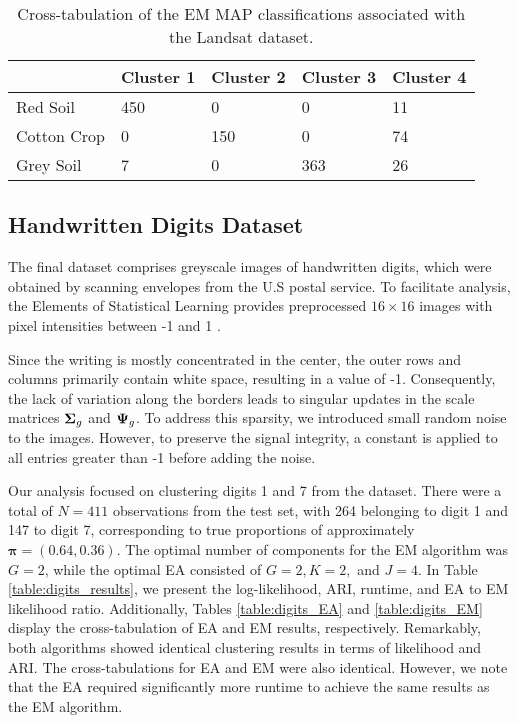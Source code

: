 \documentclass[12pt, centerh1]{article}
\begin{document}
\begin{table}[!htbp]
  \caption{Cross-tabulation of the EM MAP classifications associated with the Landsat dataset.}
      \label{table:landsat_EM}
  \begin{tabularx}{\textwidth}{l *{4}{X}}
  \toprule
   &\textbf{Cluster 1}  & \textbf{Cluster 2}  & \textbf{Cluster 3}  & \textbf{Cluster 4}   \\
  \midrule
  Red Soil & 	450 & 0 & 0 & 11\\
  Cotton Crop &0 & 150 &  0 & 74 \\
   Grey Soil &   7 & 0 &  363  & 26\\
  \bottomrule
  \end{tabularx}
\end{table}


\subsection{Handwritten Digits Dataset}
The final dataset comprises greyscale images of handwritten digits, which were obtained by scanning envelopes from the U.S postal service. To facilitate analysis, the Elements of Statistical Learning provides preprocessed $16 \times 16$ images with pixel intensities between -1 and 1 \citep{hastie2009}. 

Since the writing is mostly concentrated in the center, the outer rows and columns primarily contain white space, resulting in a value of -1. Consequently, the lack of variation along the borders leads to singular updates in the scale matrices ${\bf \Sigma}_g$ and ${\bf \Psi}_g$. To address this sparsity, we introduced small random noise to the images. However, to preserve the signal integrity, a constant is applied to all entries greater than -1 before adding the noise.

Our analysis focused on clustering digits 1 and 7 from the dataset. There were a total of $N=411$ observations from the test set, with 264 belonging to digit 1 and 147 to digit 7, corresponding to true proportions of approximately $\bm{\pi} = (0.64, 0.36)$. The optimal number of components for the EM algorithm was $G=2$, while the optimal EA consisted of $G=2, K=2,$ and $J=4$. In Table \ref{table:digits_results}, we present the log-likelihood, ARI, runtime, and EA to EM likelihood ratio. Additionally, Tables \ref{table:digits_EA} and \ref{table:digits_EM} display the cross-tabulation of EA and EM results, respectively. Remarkably, both algorithms showed identical clustering results in terms of likelihood and ARI. The cross-tabulations for EA and EM were also identical. However, we note that the EA required significantly more runtime to achieve the same results as the EM algorithm.
\end{document}
